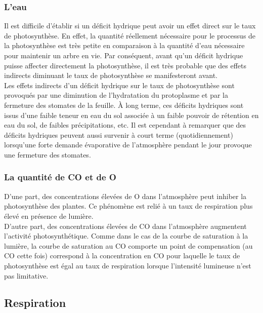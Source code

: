 \subsubsection{L'eau}

Il est difficile d'établir si un déficit hydrique peut avoir un effet direct sur le taux de photosynthèse. En effet, la quantité réellement nécessaire pour le processus de la photosynthèse est très petite en comparaison à la quantité d'eau nécessaire pour maintenir un arbre en vie. Par conséquent, avant qu'un déficit hydrique puisse affecter directement la photosynthèse, il est très probable que des effets indirects diminuant le taux de photosynthèse se manifesteront avant.\\
 
Les effets indirects d'un déficit hydrique sur le taux de photosynthèse sont provoqués par une diminution de l'hydratation du protoplasme et par la fermeture des stomates de la feuille. À long terme, ces déficits hydriques sont issus d'une faible teneur en eau du sol associée à un faible pouvoir de rétention en eau du sol, de faibles précipitations, etc. Il est cependant à remarquer que des déficits hydriques peuvent aussi survenir à court terme (quotidiennement) lorsqu'une forte demande évaporative de l'atmosphère pendant le jour provoque une fermeture des stomates. 
 
\subsubsection{La quantité de CO et de O }

D'une part, des concentrations élevées de O  dans l'atmosphère peut inhiber la photosynthèse des plantes. Ce phénomène est relié à un taux de respiration plus élevé en présence de lumière.\\

D'autre part, des concentrations élevées de CO dans l'atmosphère augmentent l'activité photosynthétique. Comme dans le cas de la courbe de saturation à la lumière, la courbe de saturation au CO  comporte un point de compensation (au CO  cette fois) correspond à la concentration en CO  pour laquelle le taux de photosynthèse est égal au taux de respiration lorsque l'intensité lumineuse n'est pas limitative. 
 
\subsection{Respiration}\label{respiration}
 
